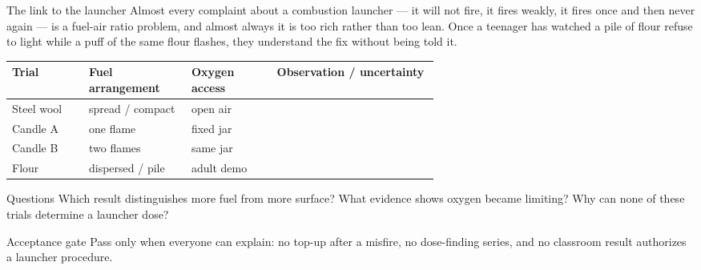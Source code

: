 \begin{telospanel}{The link to the launcher}
Almost every complaint about a combustion launcher --- it will not fire, it
fires weakly, it fires once and then never again --- is a fuel-air ratio
problem, and almost always it is too rich rather than too lean. Once a teenager
has watched a pile of flour refuse to light while a puff of the same flour
flashes, they understand the fix without being told it.
\end{telospanel}
\begin{tabularx}{\linewidth}{@{}p{0.18\linewidth}p{0.24\linewidth}p{0.20\linewidth}L@{}}
\toprule
\textbf{Trial} & \textbf{Fuel arrangement} & \textbf{Oxygen access} &
\textbf{Observation / uncertainty}\\
\midrule
Steel wool & spread / compact & open air & \rule{0pt}{2.6ex}\\
Candle A & one flame & fixed jar &\\
Candle B & two flames & same jar &\\
Flour & dispersed / pile & adult demo &\\
\bottomrule
\end{tabularx}
\begin{telospanel}{Questions}
Which result distinguishes more fuel from more surface? What evidence shows
oxygen became limiting? Why can none of these trials determine a launcher dose?
\end{telospanel}
\begin{teloshazard}{Acceptance gate}
Pass only when everyone can explain: no top-up after a misfire, no dose-finding
series, and no classroom result authorizes a launcher procedure.
\end{teloshazard}

